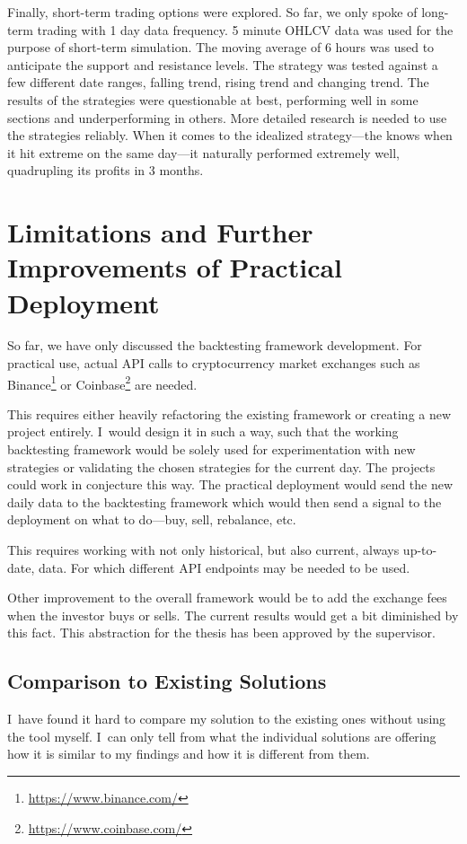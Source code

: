 Finally, short-term trading options were explored. So far, we only spoke of long-term trading with 1 day data frequency. 5 minute OHLCV data was used for the purpose of short-term simulation. The moving average of 6 hours was used to anticipate the support and resistance levels. The strategy was tested against a few different date ranges, falling trend, rising trend and changing trend. The results of the strategies were questionable at best, performing well in some sections and underperforming in others. More detailed research is needed to use the strategies reliably. When it comes to the idealized strategy---the knows when it hit extreme on the same day---it naturally performed extremely well, quadrupling its profits in 3 months.

\chapter{Limitations and Further Improvements of Practical Deployment}
\label{chapter-limitations-and-improvements}

So far, we have only discussed the backtesting framework development. For practical use, actual API calls to cryptocurrency market exchanges such as Binance\footnote{\url{https://www.binance.com/}} or Coinbase\footnote{\url{https://www.coinbase.com/}} are needed.

This requires either heavily refactoring the existing framework or creating a new project entirely. I~would design it in such a way, such that the working backtesting framework would be solely used for experimentation with new strategies or validating the chosen strategies for the current day. The projects could work in conjecture this way. The practical deployment would send the new daily data to the backtesting framework which would then send a signal to the deployment on what to do---buy, sell, rebalance, etc.

This requires working with not only historical, but also current, always up-to-date, data. For which different API endpoints may be needed to be used.

Other improvement to the overall framework would be to add the exchange fees when the investor buys or sells. The current results would get a bit diminished by this fact. This abstraction for the thesis has been approved by the supervisor.

\section{Comparison to Existing Solutions}
I~have found it hard to compare my solution to the existing ones without using the tool myself. I~can only tell from what the individual solutions are offering how it is similar to my findings and how it is different from them.

